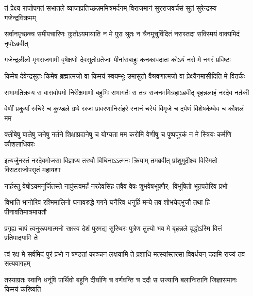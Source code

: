 \fourlineindentedshloka
{तं प्रेक्ष्य राजोपगतं सभातले}
{व्याजाप्रतिच्छन्नममित्रमर्दनम्}
{विराजमानं सुरराजवर्चसं सुतं}
{सुरेन्द्रस्य गजेन्द्रविक्रमम्}


\fourlineindentedshloka
{सर्वानपृच्छच्च समीपचारिणः}
{कुतोऽयमायाति न मे पुरा श्रुतः}
{न चैनमूचुर्विदितं नरास्तदा}
{सविस्मयं वाक्यमिदं नृपोऽब्रवीत्}




\fourlineindentedshloka
{गजेन्द्रलीलो मृगराजगामी}
{वृषेक्षणो देवसुतोग्रतेजाः}
{पीनांसबाहुः कनकावदातः}
{कोऽयं नरो मे नगरं प्रविष्टः}


\fourlineindentedshloka
{किमेष देवेन्द्रसुतः किमेष}
{ब्रह्मात्मजो वा किमयं स्वयम्भूः}
{उमासुतो वैश्रवणात्मजो वा}
{प्रेक्ष्यैनमासीदिति मे वितर्कः}



\fourlineindentedshloka
{सभामतिक्रम्य स वासवोपमो}
{निरीक्षमाणो बहुभिः सभागतैः}
{स तत्र राजनममित्रहाऽब्रवीद्}
{बृहन्नलाहं नरदेव नर्तकी}


\fourlineindentedshloka
{वेणीं प्रकुर्यां रुचिरे च कुण्डले}
{ग्रथे स्रजः प्रावरणानिसंहरे}
{स्नानं चरेयं विमृजे च दर्पणं}
{विशेषकेष्वेव च कौशलं मम}


\fourlineindentedshloka
{क्लीबेषु बालेषु जनेषु नर्तने}
{शिक्षाप्रदानेषु च योग्यता मम}
{करोमि वेणीषु च पुष्पपूरकं}
{न मे स्त्रियः कर्मणि कौशलाधिकाः}


\fourlineindentedshloka
{इत्यर्जुनस्तं नरदेवमोजसा}
{विज्ञाप्य तस्थौ विधिनाऽऽत्मनः क्रियाम्}
{तमब्रवीत् प्रांशुमुदीक्ष्य विस्मितो}
{विराटराजोपसृतं महायशाः}


\fourlineindentedshloka
{नार्हस्तु वेषोऽयमनूर्जितस्ते}
{नापुंस्त्वमर्हं नरदेवसिंह}
{तवैव वेषः शुभवेषभूषणैर्-}
{विभूषितो भूतपतेरिव प्रभो}


\fourlineindentedshloka
{विभाति भानोरिव रश्मिमालिनो}
{घनावरुद्धे गगने घनैरिव}
{धनुर्हि मन्ये तव शोभयेद्भुजौ}
{तथा हि पीनावतिमात्रमायतौ}


\fourlineindentedshloka
{प्रगृह्य चापं त्वनुरूपमात्मनो}
{रक्षस्व देशं पुरमद्य सुस्थिरः}
{पुत्रेण तुल्यो भव मे बृहन्नले}
{वृद्धोऽस्मि वित्तं प्रतिपादयामि ते}


\fourlineindentedshloka
{त्वं रक्ष मे सर्वमिदं पुरं प्रभो}
{न षण्डतां काञ्चन लक्षयामि ते}
{प्रशाधि मत्स्यांस्तरसा विवर्धयन्}
{ददामि राज्यं तव सत्यवागहम्}



\fourlineindentedshloka
{तस्याग्रतः स्वानि धनूंषि पार्थिवो}
{बहूनि दीर्घाणि च वर्णवन्ति च}
{ददौ स सज्यानि बलान्वितानि}
{जिज्ञासमानः किमयं करिष्यति}


